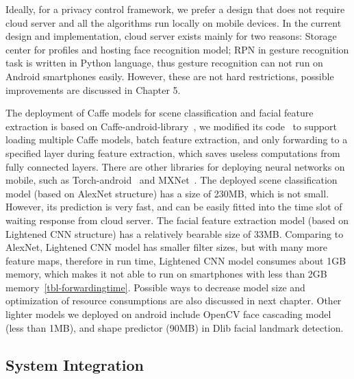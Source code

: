 Ideally, for a privacy control framework, we prefer a design that does not require cloud server and all the algorithms run locally on mobile devices. In the current design and implementation, cloud server exists mainly for two reasons:  Storage center for profiles and hosting face recognition model;  RPN in gesture recognition task is written in Python language, thus gesture recognition can not run on Android smartphones easily. However, these are not hard restrictions, possible improvements are discussed in Chapter 5.

The deployment of Caffe models for scene classification and facial feature extraction is based on Caffe-android-library~\cite{links:caffeandroidlib}, we modified its code~\cite{links:caffeandroidlibzr} to support loading multiple Caffe models, batch feature extraction, and only forwarding to a specified layer during feature extraction, which saves useless computations from fully connected layers. There are other libraries for deploying neural networks on mobile, such as Torch-android~\cite{links:torchandroid} and MXNet~\cite{links:mxnetmobile}. The deployed scene classification model (based on AlexNet structure) has a size of 230MB, which is not small. However, its prediction is very fast, and can be easily fitted into the time slot of waiting response from cloud server. The facial feature extraction model (based on Lightened CNN structure) has a relatively bearable size of 33MB. Comparing to AlexNet, Lightened CNN model has smaller filter sizes, but with many more feature maps, therefore in run time, Lightened CNN model consumes about 1GB memory, which makes it not able to run on smartphones with less than 2GB memory~\ref{tbl-forwardingtime}. Possible ways to decrease model size and optimization of resource consumptions are also discussed in next chapter. Other lighter models we deployed on android include OpenCV face cascading model (less than 1MB), and shape predictor (90MB) in Dlib facial landmark detection.


\subsection{System Integration}



